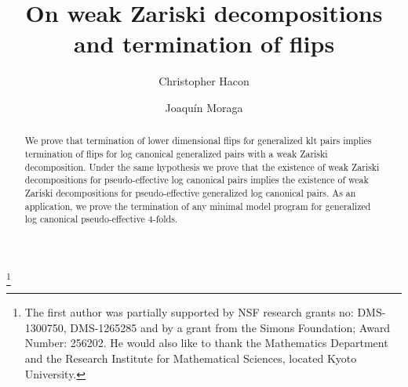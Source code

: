 \documentclass{amsart}
\theoremstyle{remark}
\numberwithin{equation}{section}
\begin{document}
\title[Weak Zariski decompositions and termination of flips]{On weak Zariski decompositions and termination of flips}

\author[C.~Hacon]{Christopher Hacon}
\address{
Department of Mathematics, University of Utah, 155 S 1400 E, JWB 233,
Salt Lake City, UT 84112, USA}

\author[J.~Moraga]{Joaqu\'in Moraga}
\address{
Department of Mathematics, University of Utah, 155 S 1400 E, JWB 321,
Salt Lake City, UT 84112, USA}


\thanks{The first author was partially supported by NSF research grants no: DMS-1300750, DMS-1265285 
and by a grant from the Simons Foundation; Award Number: 256202. He would also like
to thank the Mathematics Department and the Research Institute for Mathematical Sciences,
located Kyoto University.}

\begin{abstract}
We prove that termination of lower dimensional flips for generalized klt pairs 
implies termination of flips for log canonical generalized pairs with a weak Zariski decomposition.
Under the same hypothesis we prove that the existence of weak Zariski decompositions for pseudo-effective log canonical pairs
implies the existence of weak Zariski decompositions for pseudo-effective generalized log canonical pairs. 
As an application, we prove the termination of any minimal model program for generalized log canonical
pseudo-effective $4$-folds.
\end{abstract}

\maketitle


\setcounter{tocdepth}{1}
\tableofcontents
\end{document}

